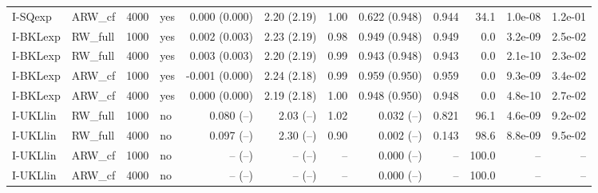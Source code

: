 \begin{tabular}{llrlrrrrrrrr}
I-SQexp & ARW\_cf & 4000 & yes & 0.000 (0.000) & 2.20 (2.19) & 1.00 & 0.622 (0.948) & 0.944 & 34.1 & 1.0e-08 & 1.2e-01 \\
I-BKLexp & RW\_full & 1000 & yes & 0.002 (0.003) & 2.23 (2.19) & 0.98 & 0.949 (0.948) & 0.949 & 0.0 & 3.2e-09 & 2.5e-02 \\
I-BKLexp & RW\_full & 4000 & yes & 0.003 (0.003) & 2.20 (2.19) & 0.99 & 0.943 (0.948) & 0.943 & 0.0 & 2.1e-10 & 2.3e-02 \\
I-BKLexp & ARW\_cf & 1000 & yes & -0.001 (0.000) & 2.24 (2.18) & 0.99 & 0.959 (0.950) & 0.959 & 0.0 & 9.3e-09 & 3.4e-02 \\
I-BKLexp & ARW\_cf & 4000 & yes & 0.000 (0.000) & 2.19 (2.18) & 1.00 & 0.948 (0.950) & 0.948 & 0.0 & 4.8e-10 & 2.7e-02 \\
I-UKLlin & RW\_full & 1000 & no & 0.080 (--) & 2.03 (--) & 1.02 & 0.032 (--) & 0.821 & 96.1 & 4.6e-09 & 9.2e-02 \\
I-UKLlin & RW\_full & 4000 & no & 0.097 (--) & 2.30 (--) & 0.90 & 0.002 (--) & 0.143 & 98.6 & 8.8e-09 & 9.5e-02 \\
I-UKLlin & ARW\_cf & 1000 & no & -- (--) & -- (--) & -- & 0.000 (--) & -- & 100.0 & -- & -- \\
I-UKLlin & ARW\_cf & 4000 & no & -- (--) & -- (--) & -- & 0.000 (--) & -- & 100.0 & -- & -- \\
\hline
\end{tabular}
